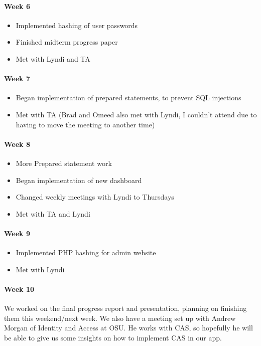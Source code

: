 \documentclass[onecolumn, draftclsnofoot,10pt, compsoc]{IEEEtran}
\begin{document}
      \paragraph{Week 6}
        \begin{itemize}
          \item Implemented hashing of user passwords
          \item Finished midterm progress paper
          \item Met with Lyndi and TA
        \end{itemize}

      \paragraph{Week 7}
        \begin{itemize}
          \item Began implementation of prepared statements, to prevent SQL injections
          \item Met with TA (Brad and Omeed also met with Lyndi, I couldn't attend due to having to move the meeting to another time)
        \end{itemize}

      \paragraph{Week 8}
        \begin{itemize}
          \item More Prepared statement work
          \item Began implementation of new dashboard
          \item Changed weekly meetings with Lyndi to Thursdays
          \item Met with TA and Lyndi
        \end{itemize}

      \paragraph{Week 9}
        \begin{itemize}
          \item Implemented PHP hashing for admin website
          \item Met with Lyndi
        \end{itemize}

      \paragraph{Week 10}
      We worked on the final progress report and presentation, planning on finishing them this weekend/next week. We also have a meeting set up with Andrew Morgan of Identity and Access at OSU. He works with CAS, so hopefully he will be able to give us some insights on how to implement CAS in our app.
\end{document}
